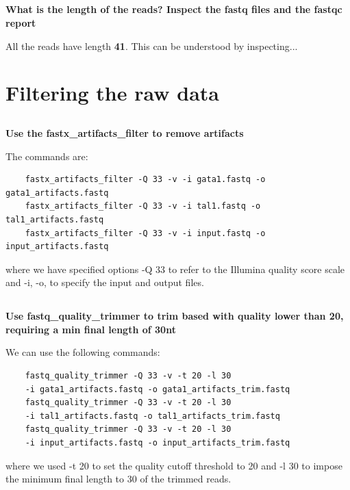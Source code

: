 \documentclass[12pt, a4paper]{article}
\begin{document}
	\subsection{}
	\textbf{What is the length of the reads? Inspect the fastq files and the fastqc report}
	
	All the reads have length \textbf{41}. This can be understood by inspecting...
	
	\section{Filtering the raw data}
	
	\subsection{}
	\textbf{Use the fastx\_artifacts\_filter to remove artifacts}
	
	The commands are:
	
	\begin{verbatim}
	fastx_artifacts_filter -Q 33 -v -i gata1.fastq -o gata1_artifacts.fastq
	fastx_artifacts_filter -Q 33 -v -i tal1.fastq -o tal1_artifacts.fastq
	fastx_artifacts_filter -Q 33 -v -i input.fastq -o input_artifacts.fastq
	\end{verbatim}
	
	where we have specified options -Q 33 to refer to the Illumina quality score scale and -i, -o, to specify the input and output files.
	
	\subsection{}
	\textbf{Use fastq\_quality\_trimmer to trim based with quality lower than 20, requiring a min final length of 30nt}
	
	We can use the following commands:
	
	\begin{verbatim}
	fastq_quality_trimmer -Q 33 -v -t 20 -l 30
	-i gata1_artifacts.fastq -o gata1_artifacts_trim.fastq
	fastq_quality_trimmer -Q 33 -v -t 20 -l 30
	-i tal1_artifacts.fastq -o tal1_artifacts_trim.fastq
	fastq_quality_trimmer -Q 33 -v -t 20 -l 30
	-i input_artifacts.fastq -o input_artifacts_trim.fastq	
	\end{verbatim}
	
	where we used -t 20 to set the quality cutoff threshold to 20 and -l 30 to impose the minimum final length to 30 of the trimmed reads.
	
\end{document}
